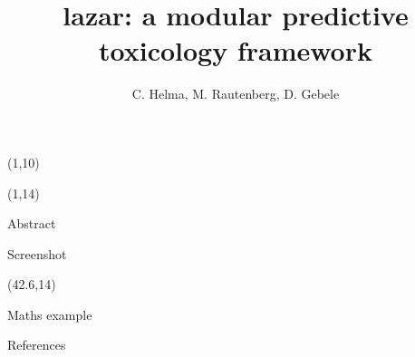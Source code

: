 \documentclass[final]{beamer}
\title{lazar: a modular predictive toxicology framework}
\author{C. Helma, M. Rautenberg, D. Gebele}
\institute{\emph{in silico} toxicology gmbh, Basel, Switzerland}
\begin{document}
    
\begin{frame}{}

\begin{textblock}{80}(1,10)

\end{textblock}

 \begin{textblock}{40.5}(1,14)
\begin{block}{Abstract}

\end{block}

\begin{block}{Screenshot}

\end{block}
\end{textblock}

\begin{textblock}{40.5}(42.6,14)

\begin{block}{Maths example}

\end{block}

\begin{block}{References}
  \small
\end{block}

\end{textblock}

\end{frame}
\end{document}
